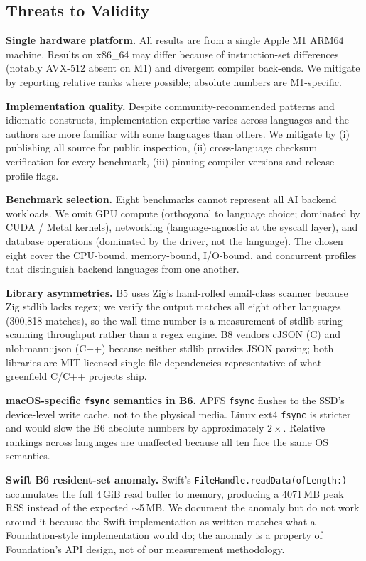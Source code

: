\documentclass[10pt,conference]{IEEEtran}
\begin{document}
\subsection{Threats to Validity}
\label{sec:threats}

\textbf{Single hardware platform.} All results are from a
single Apple M1 ARM64 machine. Results on x86\_64 may differ
because of instruction-set differences (notably AVX-512 absent on
M1) and divergent compiler back-ends. We mitigate by reporting
relative ranks where possible; absolute numbers are
M1-specific.

\textbf{Implementation quality.} Despite community-recommended
patterns and idiomatic constructs, implementation expertise
varies across languages and the authors are more familiar with
some languages than others. We mitigate by (i) publishing all
source for public inspection, (ii) cross-language checksum
verification for every benchmark, (iii) pinning compiler versions
and release-profile flags.

\textbf{Benchmark selection.} Eight benchmarks cannot represent
all AI backend workloads. We omit GPU compute (orthogonal to
language choice; dominated by CUDA / Metal kernels), networking
(language-agnostic at the syscall layer), and database
operations (dominated by the driver, not the language). The
chosen eight cover the CPU-bound, memory-bound, I/O-bound, and
concurrent profiles that distinguish backend languages from one
another.

\textbf{Library asymmetries.} B5 uses Zig's hand-rolled
email-class scanner because Zig stdlib lacks regex; we verify the
output matches all eight other languages (300{,}818 matches), so
the wall-time number is a measurement of stdlib string-scanning
throughput rather than a regex engine. B8 vendors cJSON (C) and
nlohmann::json (C++) because neither stdlib provides JSON
parsing; both libraries are MIT-licensed single-file dependencies
representative of what greenfield C/C++ projects ship.

\textbf{macOS-specific \texttt{fsync} semantics in B6.} APFS
\texttt{fsync} flushes to the SSD's device-level write cache, not
to the physical media. Linux ext4 \texttt{fsync} is stricter and
would slow the B6 absolute numbers by approximately $2\times$.
Relative rankings across languages are unaffected because all
ten face the same OS semantics.

\textbf{Swift B6 resident-set anomaly.} Swift's
\texttt{FileHandle.readData(ofLength:)} accumulates the full
4\,GiB read buffer to memory, producing a 4071\,MB peak RSS
instead of the expected $\sim$5\,MB. We document the anomaly but
do not work around it because the Swift implementation as
written matches what a Foundation-style implementation would do;
the anomaly is a property of Foundation's API design, not of
our measurement methodology.
\end{document}
